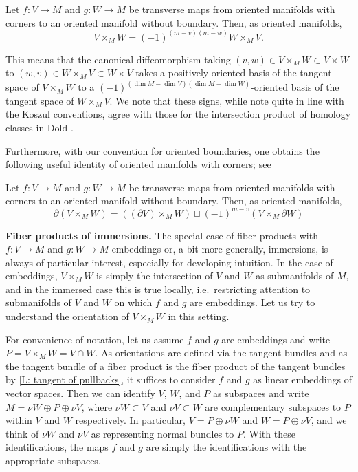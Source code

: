\begin{proposition}\label{P: commute oriented fiber}
Let $f:V\to M$ and $g:W\to M$ be transverse maps from oriented manifolds with corners to an oriented manifold without boundary. Then, as oriented manifolds, 
\begin{equation*}
V\times_M W=(-1)^{(m-v)(m-w)}W\times_M V. 
\end{equation*}
\end{proposition}
This means that the canonical diffeomorphism taking $(v,w)\in V\times_MW\subset V\times W$ to $(w,v)\in W\times_MV\subset W\times V$ takes a positively-oriented basis of the tangent space of $V\times_MW$ to a $(-1)^{(\dim M-\dim V)(\dim M-\dim W)}$-oriented basis of the tangent space of $W\times_MV$. 
We note that these signs, while note quite in line with the Koszul conventions, agree with those for the intersection product of homology classes in Dold \cite[Section VIII.13]{Dol72}. 




 Furthermore, with our convention for oriented boundaries,  one obtains the following useful identity  of oriented manifolds with corners; see \cite[Propositions 7.4 and 7.5]{Joy12}

\begin{proposition}\label{P: oriented fiber boundary}
Let $f:V\to M$ and $g:W\to M$ be transverse maps from oriented manifolds with corners to an oriented manifold without boundary. Then, as oriented manifolds, 
\begin{equation*}
\partial (V \times_M W) = ((\partial V )\times_M W )\sqcup (-1)^{m-v}(V \times_M \partial W)
\end{equation*}
\end{proposition}
 



\medskip

\noindent\textbf{Fiber products of immersions.} 
The special case of fiber products with $f:V\to M$ and $g:W\to M$ embeddings or, a bit more generally, immersions, is always of particular interest, especially for developing intuition. In the case of embeddings, $V\times_MW$ is simply the intersection of $V$ and $W$ as submanifolds of $M$, and in the immersed case this is true locally, i.e.\ restricting attention to submanifolds of $V$ and $W$ on which $f$ and $g$ are embeddings. Let us try to understand the orientation of $V\times_MW$ in this setting. 

For convenience of notation, let us assume $f$ and $g$ are embeddings and write $P=V\times_MW=V\cap W$. As orientations are defined via the tangent bundles and as the tangent bundle of a fiber product is the fiber product of the tangent bundles by \cref{L: tangent of pullbacks}, it suffices to consider $f$ and $g$ as linear embeddings of vector spaces. Then we can identify $V$, $W$, and $P$ as subspaces and write $M=\nu W\oplus P \oplus \nu V$, where $\nu W\subset V$ and $\nu V\subset W$ are complementary subspaces to $P$ within $V$ and $W$ respectively. In particular, $V=P\oplus \nu W$ and $W=P\oplus \nu V$, and we think of $\nu W$ and $\nu V$ as representing normal bundles to $P$. With these identifications, the maps $f$ and $g$ are simply the identifications with the appropriate subspaces.


